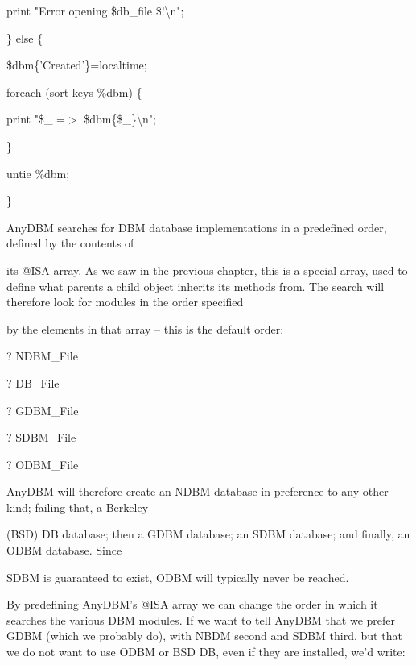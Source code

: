 \documentclass[a4paper,11pt]{book}
\begin{document}
\noindent print "Error opening \$db\_file \$!\textbackslash n";

\noindent \} else \{

\noindent \$dbm\{'Created'\}=localtime;

\noindent foreach (sort keys \%dbm) \{

\noindent print "\$\_  =$>$ \$dbm\{\$\_\}\textbackslash n";

\noindent \}

\noindent untie \%dbm;

\noindent \}

\noindent 

\noindent AnyDBM searches for DBM database implementations in a predefined order, defined by the contents of

\noindent its @ISA array. As we saw in the previous chapter, this is a special array, used to define what parents a child object inherits its methods from. The search will therefore look for modules in the order specified

\noindent by the elements in that array -- this is the default order:

\noindent 

\noindent ? NDBM\_File

\noindent 

\noindent ? DB\_File

\noindent 

\noindent ? GDBM\_File

\noindent 

\noindent ? SDBM\_File

\noindent 

\noindent ? ODBM\_File

\noindent 

\noindent AnyDBM will therefore create an NDBM database in preference to any other kind; failing that, a Berkeley

\noindent (BSD) DB database; then a GDBM database; an SDBM database; and finally, an ODBM database. Since

\noindent SDBM is guaranteed to exist, ODBM will typically never be reached.

\noindent 

\noindent By predefining AnyDBM's @ISA array we can change the order in which it searches the various DBM modules. If we want to tell AnyDBM that we prefer GDBM (which we probably do), with NBDM second and SDBM third, but that we do not want to use ODBM or BSD DB, even if they are installed, we'd write:
\end{document}
